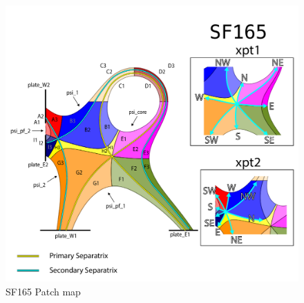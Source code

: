 \begin{figure}[H]
    \centering
        \includegraphics[width=\textwidth]{figures/configurations/SF165_collection.pdf}
        \caption{SF165 Patch map}
        \label{fig:sf165_patch_map}
\end{figure}
